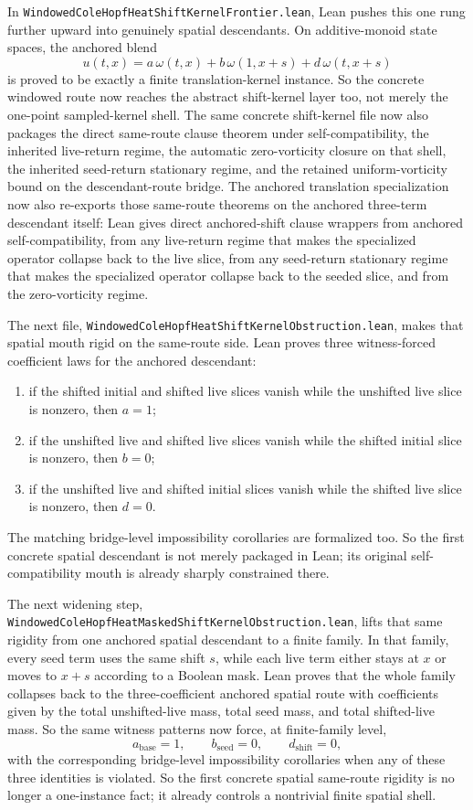 \documentclass[11pt]{article}
\begin{document}
In \texttt{WindowedColeHopfHeatShiftKernelFrontier.lean}, Lean pushes this one
rung further upward into genuinely spatial descendants.  On additive-monoid
state spaces, the anchored blend
\[
u(t,x)=a\,\omega(t,x)+b\,\omega(1,x+s)+d\,\omega(t,x+s)
\]
is proved to be exactly a finite translation-kernel instance.  So the concrete
windowed route now reaches the abstract shift-kernel layer too, not merely the
one-point sampled-kernel shell.  The same concrete shift-kernel file now also
packages the direct same-route clause theorem under self-compatibility, the
inherited live-return regime, the automatic zero-vorticity closure on that
shell, the inherited seed-return stationary regime, and the retained
uniform-vorticity bound on the descendant-route bridge.  The anchored
translation specialization now also re-exports those same-route theorems on
the anchored three-term descendant itself: Lean gives direct anchored-shift
clause wrappers from anchored self-compatibility, from any live-return regime
that makes the specialized operator collapse back to the live slice, from any
seed-return stationary regime that makes the specialized operator collapse back
to the seeded slice, and from the zero-vorticity regime.

The next file,
\texttt{WindowedColeHopfHeatShiftKernelObstruction.lean}, makes that spatial
mouth rigid on the same-route side.  Lean proves three witness-forced
coefficient laws for the anchored descendant:
\begin{enumerate}[leftmargin=1.5em]
  \item if the shifted initial and shifted live slices vanish while the
  unshifted live slice is nonzero, then \(a=1\);
  \item if the unshifted live and shifted live slices vanish while the shifted
  initial slice is nonzero, then \(b=0\);
  \item if the unshifted live and shifted initial slices vanish while the
  shifted live slice is nonzero, then \(d=0\).
\end{enumerate}
The matching bridge-level impossibility corollaries are formalized too.  So the
first concrete spatial descendant is not merely packaged in Lean; its original
self-compatibility mouth is already sharply constrained there.

The next widening step,
\texttt{WindowedColeHopfHeatMaskedShiftKernelObstruction.lean}, lifts that same
rigidity from one anchored spatial descendant to a finite family.  In that
family, every seed term uses the same shift \(s\), while each live term either
stays at \(x\) or moves to \(x+s\) according to a Boolean mask.  Lean proves
that the whole family collapses back to the three-coefficient anchored spatial
route with coefficients given by the total unshifted-live mass, total seed
mass, and total shifted-live mass.  So the same witness patterns now force, at
finite-family level,
\[
  a_{\mathrm{base}}=1,\qquad b_{\mathrm{seed}}=0,\qquad
  d_{\mathrm{shift}}=0,
\]
with the corresponding bridge-level impossibility corollaries when any of these
three identities is violated.  So the first concrete spatial same-route
rigidity is no longer a one-instance fact; it
already controls a nontrivial finite spatial shell.
\end{document}
